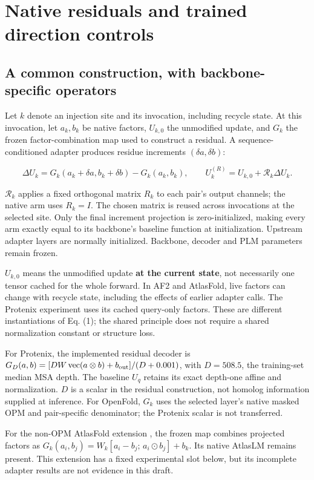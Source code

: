 \section{Native residuals and trained direction controls}
\label{sec:2}
\subsection{A common construction, with backbone-specific operators}\label{a-common-construction-with-backbone-specific-operators}

Let \(k\) denote an injection site and its invocation, including recycle state.
At this invocation, let \(a_k,b_k\) be native factors, \(U_{k,0}\) the unmodified
update, and \(G_k\) the frozen factor-combination map used to construct a residual.
A sequence-conditioned adapter produces residue increments \((\delta a,\delta b)\):

\[
\Delta U_k=G_k(a_k+\delta a,b_k+\delta b)-G_k(a_k,b_k),
\qquad
U_k^{(R)}=U_{k,0}+\mathcal R_k\Delta U_k.
\tag{1}
\]

\(\mathcal R_k\) applies a fixed orthogonal matrix \(R_k\) to each pair's output
channels; the native arm uses \(R_k=I\). The chosen matrix is reused across
invocations at the selected site. Only the final increment projection is
zero-initialized, making every arm exactly equal to its backbone's baseline
function at initialization. Upstream adapter layers are normally initialized.
Backbone, decoder and PLM parameters remain frozen.

\(U_{k,0}\) means the unmodified update \textbf{at the current state}, not necessarily
one tensor cached for the whole forward. In AF2 and AtlasFold, live factors
can change with recycle state, including the effects of earlier adapter calls.
The Protenix experiment uses its cached query-only factors. These are different
instantiations of Eq. (1); the shared principle does not require a shared
normalization constant or structure loss.

For Protenix, the implemented residual decoder is
\(G_D(a,b)=[D W\operatorname{vec}(a\otimes b)+b_{\rm out}]/(D+0.001)\),
with \(D=508.5\), the training-set median MSA depth. The baseline \(U_q\) retains
its exact depth-one affine and normalization. \(D\) is a scalar in the residual
construction, not homolog information supplied at inference. For OpenFold,
\(G_k\) uses the selected layer's native masked OPM and pair-specific denominator;
the Protenix scalar is not transferred.

For the non-OPM AtlasFold extension \citep{atlasfold_code}, the frozen map combines projected factors
as \(G_k(a_i,b_j)=W_k[a_i-b_j;\,a_i\odot b_j]+b_k\).
Its native AtlasLM remains present. This extension has a fixed experimental
slot below, but its incomplete adapter results are not evidence in this draft.

